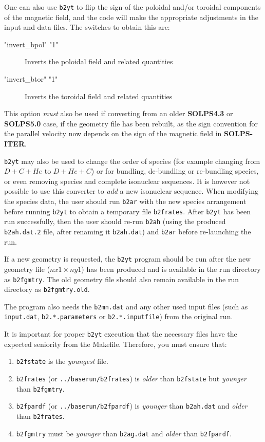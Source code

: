 \documentclass[a4paper,10pt]{report}
\newcommand\SOLPSITERns{{\bf SOLPS-ITER}}
\begin{document}
One can also use {\tt b2yt} to flip the sign of the poloidal and/or toroidal components
of the magnetic field, and the code will make the appropriate adjustments in the input
and data files. The switches to obtain this are:
\begin{description}
  \item["invert\_bpol" "1"] Inverts the poloidal field and related quantities
  \item["invert\_btor" "1"] Inverts the toroidal field and related quantities
\end{description}
This option {\em must} also be used if converting from an older {\bf SOLPS4.3} or {\bf SOLPS5.0} case, if the geometry file has been rebuilt, as the sign convention for the parallel velocity now depends on the sign of the magnetic field in \SOLPSITERns.

{\tt b2yt} may also be used
to change the order of species (for example changing from $D+C+He$ to $D+He+C$) or for
bundling, de-bundling or re-bundling species, or even removing species and complete
isonuclear sequences. It is however not possible to use this converter to {\em add}
a new isonuclear sequence. When modifying the species data, the user
should run {\tt b2ar} with the new species arrangement before running {\tt b2yt}
to obtain a temporary file {\tt b2frates}. After {\tt b2yt} has been run successfully,
then the user should re-run {\tt b2ah} (using the produced {\tt b2ah.dat.2} file,
after renaming it {\tt b2ah.dat}) and {\tt b2ar} before re-launching the run.

If a new geometry is requested, the {\tt b2yt} program should be run after the
new geometry file ($nx1 \times ny1$) has
been produced and is available in the run directory as {\tt b2fgmtry}.
The old geometry file should also remain available in
the run directory as {\tt b2fgmtry.old}.

The program also needs the {\tt b2mn.dat} and any other used input files (such
as {\tt input.dat}, {\tt b2.*.parameters} or {\tt b2.*.inputfile}) from
the original run.

It is important for proper {\tt b2yt} execution that the necessary files have the
expected seniority from the Makefile. Therefore, you must ensure that:
\begin{enumerate}
  \item {\tt b2fstate} is the {\em youngest} file.
  \item {\tt b2frates} (or {\tt ../baserun/b2frates}) is {\em older} than {\tt b2fstate} but {\em younger} than {\tt b2fgmtry}.
  \item {\tt b2fpardf} (or {\tt ../baserun/b2fpardf}) is {\em younger} than {\tt b2ah.dat} and
         {\em older} than {\tt b2frates}.
  \item {\tt b2fgmtry} must be {\em younger} than {\tt b2ag.dat} and {\em older} than {\tt b2fpardf}.
\end{enumerate}
\end{document}
